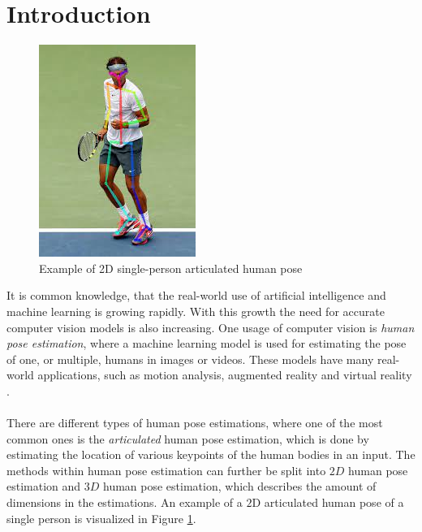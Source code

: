 \documentclass[./main.tex]{subfiles}
\begin{document}
\section{Introduction}
\begin{figure}[htbp]
    \centering
    \includegraphics[height = 6 cm]{./entities/pose_estimation_example_img.jpg}
    \caption{Example of 2D single-person articulated human pose \cite{pose_estimation_example}}
    \label{fig:pose_estimation_example_fig}
\end{figure}
\noindent It is common knowledge, that the real-world use of artificial intelligence and machine learning is growing rapidly. With this growth the need for accurate computer vision models is also increasing. One usage of computer vision is \textit{human pose estimation}, where a machine learning model is used for estimating the pose of one, or multiple, humans in images or videos. These models have many real-world applications, such as motion analysis, augmented reality and virtual reality \cite{survey_2}.
\\
\\
There are different types of human pose estimations, where one of the most common ones is the \textit{articulated} human pose estimation, which is done by estimating the location of various keypoints of the human bodies in an input. The methods within human pose estimation can further be split into $2D$ human pose estimation and $3D$ human pose estimation, which describes the amount of dimensions in the estimations. An example of a $2$D articulated human pose of a single person is visualized in Figure \ref{fig:pose_estimation_example_fig}.
\\
\\
\end{document}
